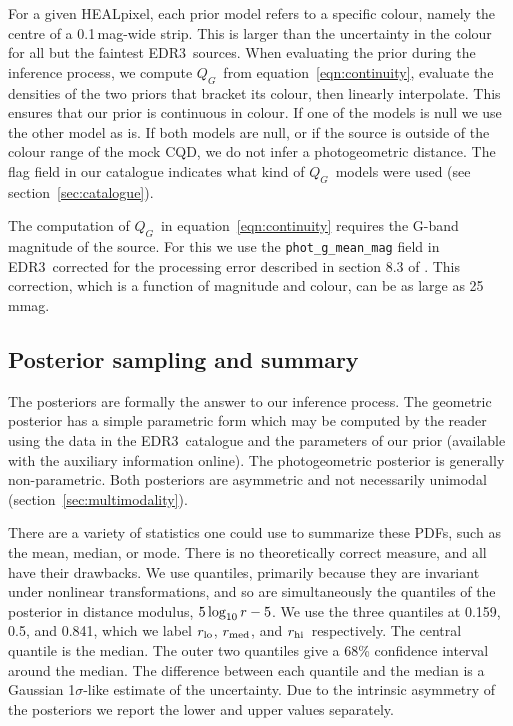 \documentclass[twocolumn]{aastex62}
\providecommand{\logten}{\ensuremath{\log_{\rm 10}}}
\providecommand{\logten}{\ensuremath{\log_{\rm 10}}}
\providecommand{\release}{EDR3}
\providecommand{\gmag}{\ensuremath{G}}
\providecommand{\QG}{\ensuremath{Q_G}}
\providecommand{\dist}{\ensuremath{r}}
\providecommand{\rlo}{\ensuremath{\dist_{\rm lo}}}
\providecommand{\rhi}{\ensuremath{\dist_{\rm hi}}}
\providecommand{\rmed}{\ensuremath{\dist_{\rm med}}}
\begin{document}
For a given HEALpixel, each prior model refers to a specific colour, namely the centre of a 0.1\,mag-wide strip.
This is larger than the uncertainty in the colour for all but the faintest \release\ sources.
When evaluating the prior during the inference process, we compute \QG\ from equation~\ref{eqn:continuity}, evaluate the densities of the two priors that bracket its colour, then linearly interpolate. This ensures that our prior is continuous in colour. If one of the models is null we use the other model as is. If both models are null, or if the source is outside of the colour range of the mock CQD, we do not infer a photogeometric distance.
The flag field in our catalogue indicates what kind of \QG\ models were used (see section~\ref{sec:catalogue}).

The computation of \QG\ in equation~\ref{eqn:continuity} requires the G-band magnitude of the source. For this we use the {\tt phot\_g\_mean\_mag} field in \release\ corrected for the processing error described in section 8.3 of \cite{riello_etal_gedr3_photometry}. This correction, which is a function of magnitude and colour, can be as large as 25\,mmag. 


\subsection{Posterior sampling and summary}\label{sec:sampling}

The posteriors are formally the answer to our inference process.
The geometric posterior has a simple parametric form which may be computed by the reader using the data in the \release\ catalogue and the parameters of our prior (available with the auxiliary information online).
The photogeometric posterior is generally non-parametric.
Both posteriors are asymmetric and not necessarily unimodal (section~\ref{sec:multimodality}).

There are a variety of statistics one could use to summarize these PDFs, such as the mean, median, or mode.
There is no theoretically correct measure, and all have their drawbacks. 
We use quantiles, primarily because they are invariant under nonlinear transformations, and 
so are simultaneously the quantiles of the posterior in distance modulus, $5\logten\dist-5$.
We use the three quantiles at 0.159, 0.5, and 0.841, 
which we label  \rlo, \rmed, and \rhi\ respectively. The central quantile is the median. The outer two quantiles give a 68\% confidence interval around the median. The difference between each quantile and the median is a Gaussian 1$\sigma$-like estimate of the uncertainty. Due to the intrinsic asymmetry of the posteriors we report the lower and upper values separately.
\end{document}
